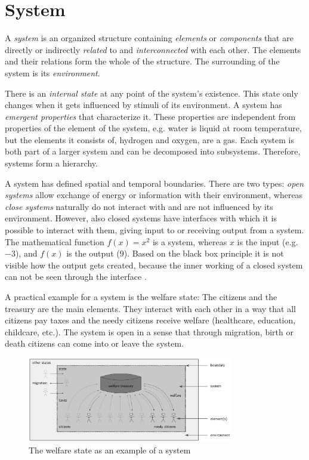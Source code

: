 

\section{System} %
\label{sub:system}

A \emph{system} is an organized structure containing \emph{elements} or \emph{components} that are directly or indirectly \emph{related} to and \emph{interconnected} with each other. The elements and their relations form the whole of the structure. The surrounding of the system is its \emph{environment}.

There is an \emph{internal state} at any point of the system's existence. This state only changes when it gets influenced by stimuli of its environment. A system has \emph{emergent properties} that characterize it. These properties are independent from properties of the element of the system, e.g. water is liquid at room temperature, but the elements it consists of, hydrogen and oxygen, are a gas. Each system is both part of a larger system and can be decomposed into subsystems. Therefore, systems form a hierarchy.

A system has defined spatial and temporal boundaries. There are two types: \emph{open systems} allow exchange of energy or information with their environment, whereas \emph{close systems} naturally do not interact with and are not influenced by its environment. However, also closed systems have interfaces with which it is possible to interact with them, giving input to or receiving output from a system. The mathematical function $f(x) = x^2$ is a system, whereas $x$ is the input (e.g. $-3$), and $f(x)$ is the output ($9$). Based on the black box principle it is not visible how the output gets created, because the inner working of a closed system can not be seen through the interface
\cite{system}.

A practical example for a system is the welfare state: The citizens and the treasury are the main elements. They interact with each other in a way that all citizens pay taxes and the needy citizens receive welfare (healthcare, education, childcare, etc.). The system is open in a sense that through migration, birth or death citizens can come into or leave the system.

\begin{figure}[ht]
  \centering
  \includegraphics[width = 0.8\textwidth]{graphics/basics/social_system}
  \caption{The welfare state as an example of a system}
  \label{fig:social_system}
\end{figure}


